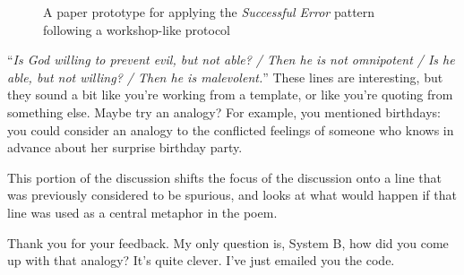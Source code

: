 \begin{figure*}[t]
\begin{center}
\end{center}
\caption{A paper prototype for applying the \emph{Successful Error} pattern following a workshop-like protocol\label{fig:paper-prototype}}
\end{figure*}

\begin{center}
\begin{minipage}{.9\columnwidth}
\begin{dialogue}
 ``\emph{Is God willing to prevent evil, but not able? / Then he is not omnipotent / Is he able, but not willing? / Then he is malevolent.}''
%
 These lines are interesting, but
they sound a bit like you're working from a
template, or like you're quoting from something
else.
%
 Maybe try an analogy?  For example, you mentioned
birthdays: you could consider an analogy to the conflicted feelings of
someone who knows in advance about her surprise birthday party.
\end{dialogue}
\end{minipage}
\end{center}

This portion of the discussion shifts the focus
of the discussion onto a line that was previously
considered to be spurious, and looks at what
would happen if that line was used as a central
metaphor in the poem.

\begin{center}
\begin{minipage}{.9\columnwidth}
\begin{dialogue}
 Thank you for your feedback.  My only question is, System
B, how did you come up with that analogy?  It's quite clever.
%
 I've just emailed you the code.
\end{dialogue}
\end{minipage}
\end{center}

